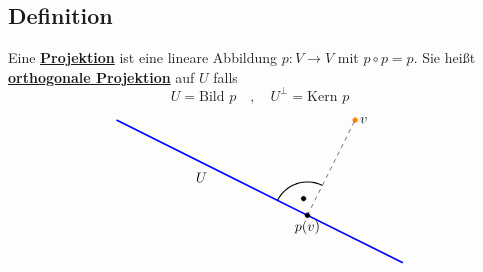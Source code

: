 \subsection{Definition} %
\label{sub:definition_14.13}
Eine \underline{\textbf{Projektion}} ist eine lineare Abbildung $p : V \to V$ mit $p \circ p = p$. Sie heißt \underline{\textbf{orthogonale Projektion}} auf $U$ falls
\[
	U = \text{Bild }p \quad , \quad U^\bot = \text{Kern }p
\]
\[
	\begin{tikzpicture}[scale=1.2]
	\draw [blue, very thick](0,3) --(6,0);
	\node [below left] at (2,2) {$U$};
	\draw [orange,fill] (5,3) circle [radius= 0.05];
	\node [right] at (5,3) {$v$};
	\draw [dashed] (4,1) -- (5,3);
	\draw [thick,domain=63.434:153.434] plot ({cos(\x)* 0.7+4}, {sin(\x)* 0.7+1});
	\draw [fill] (3.92,1.35) circle [radius= 0.05];
	\draw [fill] (4,1) circle [radius=0.05] node[below] (4,1) {$p(v)$};
\end{tikzpicture}
\]

